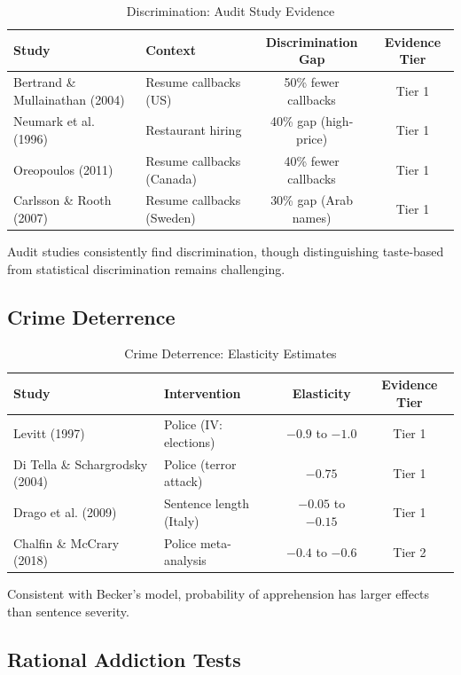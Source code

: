 \begin{table}[htbp]
\centering
\caption{Discrimination: Audit Study Evidence}
\label{tab:gb-discrimination-evidence}
\begin{tabular}{llcc}
\toprule
\textbf{Study} & \textbf{Context} & \textbf{Discrimination Gap} & \textbf{Evidence Tier} \\
\midrule
Bertrand \& Mullainathan (2004) & Resume callbacks (US) & 50\% fewer callbacks & Tier 1 \\
Neumark et al. (1996) & Restaurant hiring & 40\% gap (high-price) & Tier 1 \\
Oreopoulos (2011) & Resume callbacks (Canada) & 40\% fewer callbacks & Tier 1 \\
Carlsson \& Rooth (2007) & Resume callbacks (Sweden) & 30\% gap (Arab names) & Tier 1 \\
\bottomrule
\end{tabular}
\end{table}

Audit studies consistently find discrimination, though distinguishing taste-based from statistical discrimination remains challenging.

\subsection{Crime Deterrence}

\begin{table}[htbp]
\centering
\caption{Crime Deterrence: Elasticity Estimates}
\label{tab:gb-crime-evidence}
\begin{tabular}{llcc}
\toprule
\textbf{Study} & \textbf{Intervention} & \textbf{Elasticity} & \textbf{Evidence Tier} \\
\midrule
Levitt (1997) & Police (IV: elections) & $-0.9$ to $-1.0$ & Tier 1 \\
Di Tella \& Schargrodsky (2004) & Police (terror attack) & $-0.75$ & Tier 1 \\
Drago et al. (2009) & Sentence length (Italy) & $-0.05$ to $-0.15$ & Tier 1 \\
Chalfin \& McCrary (2018) & Police meta-analysis & $-0.4$ to $-0.6$ & Tier 2 \\
\bottomrule
\end{tabular}
\end{table}

Consistent with Becker's model, probability of apprehension has larger effects than sentence severity.

\subsection{Rational Addiction Tests}

